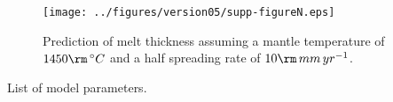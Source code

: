 \documentclass[draft,grl]{agutexSI2018}
\begin{document}
\begin{figure}
\texttt{[image: ../figures/version05/supp-figureN.eps]}
\caption{Prediction of melt thickness assuming a mantle temperature of $1450\rm\,^{\circ}C$ and a half spreading rate of $10\rm\,mm\,yr^{-1}$.}
\label{fg:S4}
\end{figure}

%
%
\begin{table}
\caption{List of model parameters.}
\end{table}
\end{document}
